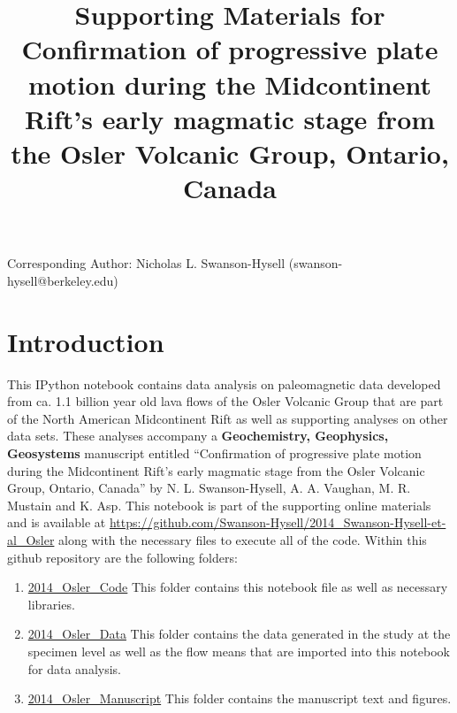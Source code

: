\documentclass{article}
\title{Supporting Materials for Confirmation of progressive plate motion during the Midcontinent Rift’s early magmatic stage from the Osler Volcanic Group, Ontario, Canada}
\begin{document}
    
    
    \maketitle
    
    



    Corresponding Author: Nicholas L. Swanson-Hysell
(swanson-hysell@berkeley.edu)


    \section{Introduction}


    This IPython notebook contains data analysis on paleomagnetic data
developed from ca. 1.1 billion year old lava flows of the Osler Volcanic
Group that are part of the North American Midcontinent Rift as well as
supporting analyses on other data sets. These analyses accompany a
\textbf{Geochemistry, Geophysics, Geosystems} manuscript entitled
``Confirmation of progressive plate motion during the Midcontinent
Rift's early magmatic stage from the Osler Volcanic Group, Ontario,
Canada'' by N. L. Swanson-Hysell, A. A. Vaughan, M. R. Mustain and K.
Asp. This notebook is part of the supporting online materials and is
available at
\url{https://github.com/Swanson-Hysell/2014_Swanson-Hysell-et-al_Osler}
along with the necessary files to execute all of the code. Within this
github repository are the following folders:

\begin{enumerate}
\def\labelenumi{\arabic{enumi}.}
\itemsep1pt\parskip0pt
\item
  \href{https://github.com/Swanson-Hysell/2014_Swanson-Hysell-et-al_Osler/tree/master/2014_Osler_Code}{2014\_Osler\_Code}
  This folder contains this notebook file as well as necessary
  libraries.
\item
  \href{https://github.com/Swanson-Hysell/2014_Swanson-Hysell-et-al_Osler/tree/master/2014_Osler_Data}{2014\_Osler\_Data}
  This folder contains the data generated in the study at the specimen
  level as well as the flow means that are imported into this notebook
  for data analysis.
\item
  \href{https://github.com/Swanson-Hysell/2014_Swanson-Hysell-et-al_Osler/tree/master/2014_Osler_Manuscript}{2014\_Osler\_Manuscript}
  This folder contains the manuscript text and figures.
\end{enumerate}
\end{document}

